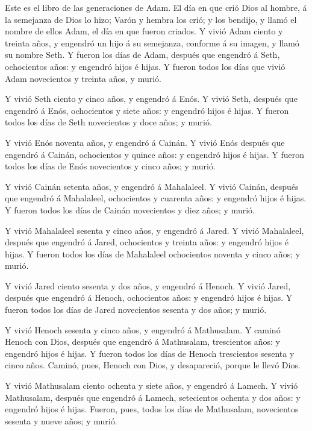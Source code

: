  Este es el libro de las generaciones de Adam. El día en que
crió Dios al hombre, á la semejanza de Dios lo hizo;  Varón
y hembra los crió; y los bendijo, y llamó el nombre de ellos Adam, el
día en que fueron criados.  Y vivió Adam ciento y treinta
años, y engendró un hijo á su semejanza, conforme á su imagen, y llamó
su nombre Seth.  Y fueron los días de Adam, después que
engendró á Seth, ochocientos años: y engendró hijos é hijas.
 Y fueron todos los días que vivió Adam novecientos y
treinta años, y murió.

 Y vivió Seth ciento y cinco años, y engendró á Enós.
 Y vivió Seth, después que engendró á Enós, ochocientos y
siete años: y engendró hijos é hijas.  Y fueron todos los
días de Seth novecientos y doce años; y murió.

 Y vivió Enós noventa años, y engendró á Cainán.
 Y vivió Enós después que engendró á Cainán, ochocientos y
quince años: y engendró hijos é hijas.  Y fueron todos los
días de Enós novecientos y cinco años; y murió.

 Y vivió Cainán setenta años, y engendró á Mahalaleel.
 Y vivió Cainán, después que engendró á Mahalaleel,
ochocientos y cuarenta años: y engendró hijos é hijas.  Y
fueron todos los días de Cainán novecientos y diez años; y murió.

 Y vivió Mahalaleel sesenta y cinco años, y engendró á
Jared.  Y vivió Mahalaleel, después que engendró á Jared,
ochocientos y treinta años: y engendró hijos é hijas.  Y
fueron todos los días de Mahalaleel ochocientos noventa y cinco años; y
murió.

 Y vivió Jared ciento sesenta y dos años, y engendró á
Henoch.  Y vivió Jared, después que engendró á Henoch,
ochocientos años: y engendró hijos é hijas.  Y fueron todos
los días de Jared novecientos sesenta y dos años; y murió.

 Y vivió Henoch sesenta y cinco años, y engendró á
Mathusalam.  Y caminó Henoch con Dios, después que engendró
á Mathusalam, trescientos años: y engendró hijos é hijas. 
Y fueron todos los días de Henoch trescientos sesenta y cinco años.
 Caminó, pues, Henoch con Dios, y desapareció, porque le
llevó Dios.

 Y vivió Mathusalam ciento ochenta y siete años, y engendró
á Lamech.  Y vivió Mathusalam, después que engendró á
Lamech, setecientos ochenta y dos años: y engendró hijos é hijas.
 Fueron, pues, todos los días de Mathusalam, novecientos
sesenta y nueve años; y murió.

